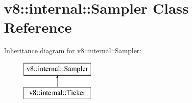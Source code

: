 \hypertarget{classv8_1_1internal_1_1_sampler}{}\section{v8\+:\+:internal\+:\+:Sampler Class Reference}
\label{classv8_1_1internal_1_1_sampler}
Inheritance diagram for v8\+:\+:internal\+:\+:Sampler\+:\begin{figure}[H]
\begin{center}
\leavevmode
\includegraphics[height=2.000000cm]{classv8_1_1internal_1_1_sampler}
\end{center}
\end{figure}
